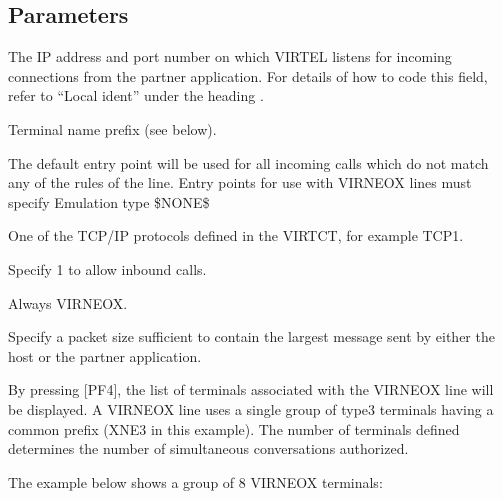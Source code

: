\documentclass[letterpaper,10pt,english]{sphinxmanual}
\begin{document}
\subsection{Parameters}
\label{\detokenize{connectivity_guide:index-59}}\label{\detokenize{connectivity_guide:id26}}\begin{description}
\sphinxAtStartPar
The IP address and port number on which VIRTEL listens for incoming connections from the partner application. For details of how to code this field, refer to “Local ident” under the heading .

\sphinxAtStartPar
Terminal name prefix (see below).

\sphinxAtStartPar
The default entry point will be used for all incoming calls which do not match any of the rules of the line. Entry points for use with VIRNEOX lines must specify Emulation type \$NONE\$

\sphinxAtStartPar
One of the TCP/IP protocols defined in the VIRTCT, for example TCP1.

\sphinxAtStartPar
Specify 1 to allow inbound calls.

\sphinxAtStartPar
Always VIRNEOX.

\sphinxAtStartPar
Specify a packet size sufficient to contain the largest message sent by either the host or the partner application.

\sphinxAtStartPar
By pressing {[}PF4{]}, the list of terminals associated with the VIRNEOX line will be displayed. A VIRNEOX line uses a single group of type\sphinxhyphen{}3 terminals having a common prefix (XNE3 in this example). The number of terminals defined determines the number of simultaneous conversations authorized.

\sphinxAtStartPar
The example below shows a group of 8 VIRNEOX terminals:

\end{description}

\sphinxAtStartPar
{}

\ignorespaces 
\end{document}
